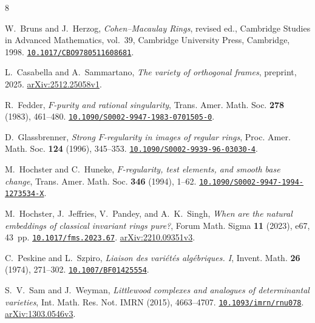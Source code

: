 \documentclass[11pt]{article}
\theoremstyle{definition}
\theoremstyle{remark}
\numberwithin{equation}{section}
\newcommand{\doi}[1]{\href{https://doi.org/#1}{\nolinkurl{#1}}}
\begin{document}
\begin{thebibliography}{8}

W.~Bruns and J.~Herzog,
\emph{Cohen--Macaulay Rings}, revised ed.,
Cambridge Studies in Advanced Mathematics, vol.~39,
Cambridge University Press, Cambridge, 1998.
\doi{10.1017/CBO9780511608681}.

L.~Casabella and A.~Sammartano,
\emph{The variety of orthogonal frames},
preprint, 2025.
\href{https://arxiv.org/abs/2512.25058v1}{arXiv:2512.25058v1}.

R.~Fedder,
\emph{$F$-purity and rational singularity},
Trans. Amer. Math. Soc. \textbf{278} (1983), 461--480.
\doi{10.1090/S0002-9947-1983-0701505-0}.

D.~Glassbrenner,
\emph{Strong $F$-regularity in images of regular rings},
Proc. Amer. Math. Soc. \textbf{124} (1996), 345--353.
\doi{10.1090/S0002-9939-96-03030-4}.

M.~Hochster and C.~Huneke,
\emph{$F$-regularity, test elements, and smooth base change},
Trans. Amer. Math. Soc. \textbf{346} (1994), 1--62.
\doi{10.1090/S0002-9947-1994-1273534-X}.

M.~Hochster, J.~Jeffries, V.~Pandey, and A.~K.~Singh,
\emph{When are the natural embeddings of classical invariant rings pure?},
Forum Math. Sigma \textbf{11} (2023), e67, 43~pp.
\doi{10.1017/fms.2023.67}.
\href{https://arxiv.org/abs/2210.09351v3}{arXiv:2210.09351v3}.

C.~Peskine and L.~Szpiro,
\emph{Liaison des vari\'et\'es alg\'ebriques. I},
Invent. Math. \textbf{26} (1974), 271--302.
\doi{10.1007/BF01425554}.

S.~V.~Sam and J.~Weyman,
\emph{Littlewood complexes and analogues of determinantal varieties},
Int. Math. Res. Not. IMRN (2015), 4663--4707.
\doi{10.1093/imrn/rnu078}.
\href{https://arxiv.org/abs/1303.0546v3}{arXiv:1303.0546v3}.

\end{thebibliography}
\end{document}
